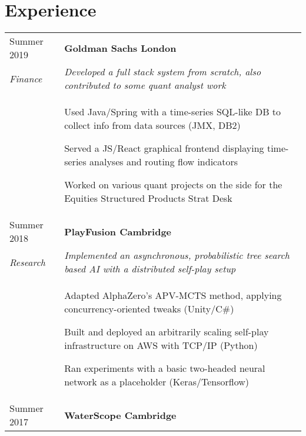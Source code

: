 \documentclass[letterpaper, 10pt]{article}
\begin{document}

\section*{Experience}
\begin{tabularx}{\linewidth}{>{\raggedleft}p{2.2cm}|X}
Summer 2019			& \textbf{Goldman Sachs \hfill London}\\
\textit{Finance}	& \textit{Developed a full stack system from scratch, also contributed to some quant analyst work}\\
					& \vspace{-.5\baselineskip}\begin{compact}
						\item Used Java/Spring with a time-series SQL-like DB to collect info from data sources (JMX, DB2)
						\item Served a JS/React graphical frontend displaying time-series analyses and routing flow indicators
						\item Worked on various quant projects on the side for the Equities Structured Products Strat Desk
						\vspace{-.5\baselineskip}
					\end{compact}\\
Summer 2018	& \textbf{PlayFusion \hfill Cambridge}\\
\textit{Research}	& \textit{Implemented an asynchronous, probabilistic tree search based AI with a distributed self-play setup}\\
					& \vspace{-.5\baselineskip}\begin{compact}
						\item Adapted AlphaZero's APV-MCTS method, applying concurrency-oriented tweaks (Unity/C\#)
						\item Built and deployed an arbitrarily scaling self-play infrastructure on AWS with TCP/IP (Python)
						\item Ran experiments with a basic two-headed neural network as a placeholder (Keras/Tensorflow)
						\vspace{-.5\baselineskip}
					\end{compact}\\
Summer 2017	& \textbf{WaterScope \hfill Cambridge}\\

\end{tabularx}
\end{document}
